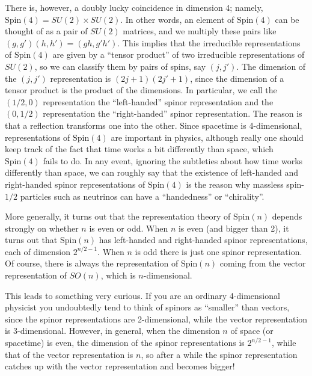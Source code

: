 \documentclass{article}
\begin{document}
There is, however, a doubly lucky coincidence in dimension 4; namely,
\(\mathrm{Spin}(4) = SU(2) \times SU(2)\). In other words, an element of
\(\mathrm{Spin}(4)\) can be thought of as a pair of \(SU(2)\) matrices,
and we multiply these pairs like \((g,g')(h,h') = (gh,g'h')\). This
implies that the irreducible representations of \(\mathrm{Spin}(4)\) are
given by a ``tensor product'' of two irreducible representations of
\(SU(2)\), so we can classify them by pairs of spins, say \((j,j')\).
The dimension of the \((j,j')\) representation is \((2j+1)(2j'+1)\),
since the dimension of a tensor product is the product of the
dimensions. In particular, we call the \((1/2,0)\) representation the
``left-handed'' spinor representation and the \((0,1/2)\) representation
the ``right-handed'' spinor representation. The reason is that a
reflection transforms one into the other. Since spacetime is
4-dimensional, representations of \(\mathrm{Spin}(4)\) are important in
physics, although really one should keep track of the fact that time
works a bit differently than space, which \(\mathrm{Spin}(4)\) fails to
do. In any event, ignoring the subtleties about how time works
differently than space, we can roughly say that the existence of
left-handed and right-handed spinor representations of
\(\mathrm{Spin}(4)\) is the reason why massless spin-\(1/2\) particles
such as neutrinos can have a ``handedness'' or ``chirality''.

More generally, it turns out that the representation theory of
\(\mathrm{Spin}(n)\) depends strongly on whether \(n\) is even or odd.
When \(n\) is even (and bigger than 2), it turns out that
\(\mathrm{Spin}(n)\) has left-handed and right-handed spinor
representations, each of dimension \(2^{n/2-1}\). When \(n\) is odd
there is just one spinor representation. Of course, there is always the
representation of \(\mathrm{Spin}(n)\) coming from the vector
representation of \(SO(n)\), which is \(n\)-dimensional.

This leads to something very curious. If you are an ordinary
4-dimensional physicist you undoubtedly tend to think of spinors as
``smaller'' than vectors, since the spinor representations are
2-dimensional, while the vector representation is 3-dimensional.
However, in general, when the dimension \(n\) of space (or spacetime) is
even, the dimension of the spinor representations is \(2^{n/2-1}\),
while that of the vector representation is \(n\), so after a while the
spinor representation catches up with the vector representation and
becomes bigger!
\end{document}
